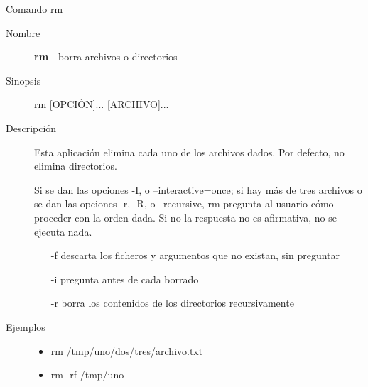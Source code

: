 \begin{frame}[c]{Comando rm}
  \begin{description}
    \item[Nombre]
      \textbf{rm} - borra archivos o directorios

    \vspace{\baselineskip}
    \item[Sinopsis]
      rm [OPCIÓN]... [ARCHIVO]...
      
    \vspace{\baselineskip}
    \item[Descripción]
      Esta aplicación elimina cada uno de los archivos dados. Por defecto,
      no elimina directorios.

      Si se dan las opciones -I, o --interactive=once; si hay más de tres
      archivos o se dan las opciones -r, -R, o --recursive, rm pregunta al
      usuario cómo proceder con la orden dada. Si no la respuesta no es
      afirmativa, no se ejecuta nada.

      \begin{itemize}
        \item [-f] descarta los ficheros y argumentos que no existan,
          sin preguntar
        \item [-i] pregunta antes de cada borrado
        \item [-r] borra los contenidos de los directorios recursivamente
      \end{itemize}

    \vspace{\baselineskip}
    \item[Ejemplos]
      \begin{itemize}
        \item rm /tmp/uno/dos/tres/archivo.txt
        \item rm -rf /tmp/uno
      \end{itemize}
  \end{description}
\end{frame}

